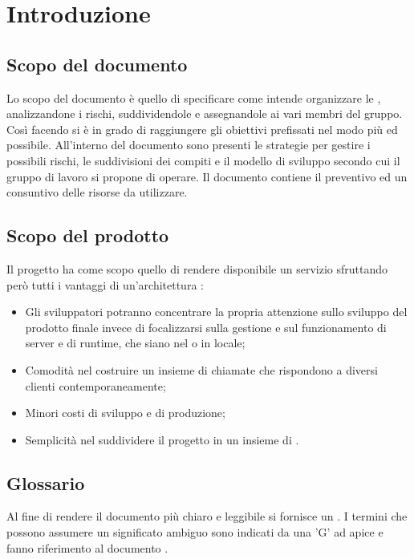 \section{Introduzione}
\label{introduzione}
\subsection{Scopo del documento}
Lo scopo del documento è quello di specificare come {\Gruppo} intende organizzare le , analizzandone i rischi, suddividendole e assegnandole ai vari membri del gruppo. Così facendo si è in grado di raggiungere gli obiettivi prefissati nel modo più  ed  possibile. All'interno del documento sono presenti le strategie per gestire i possibili rischi, le suddivisioni dei compiti e il modello di sviluppo secondo cui il gruppo di lavoro si propone di operare. Il documento contiene il preventivo ed un consuntivo delle risorse da utilizzare.

\subsection{Scopo del prodotto}
Il progetto {\NomeProgetto} ha come scopo quello di rendere disponibile un servizio  sfruttando però tutti i vantaggi di un'architettura :
\begin{itemize}
    \item Gli sviluppatori potranno concentrare la propria attenzione sullo sviluppo del prodotto finale invece di focalizzarsi sulla gestione e sul funzionamento di server e di runtime, che siano nel  o in locale;
    \item Comodità nel costruire un insieme di chiamate  che rispondono a diversi clienti contemporaneamente;
    \item Minori costi di sviluppo e di produzione;
    \item Semplicità nel suddividere il progetto in un insieme di .
\end{itemize}

\subsection{Glossario}
Al fine di rendere il documento più chiaro e leggibile si fornisce un \Glossario{}. I termini che possono assumere un significato ambiguo sono indicati da una 'G' ad apice e fanno riferimento al documento .

